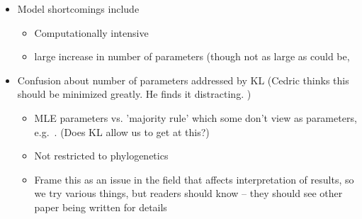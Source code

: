 \documentclass[12pt,letterpaper]{article}
\begin{document}
\begin{itemize}
\begin{itemize}
  \end{itemize}
\item Model shortcomings include 
  \begin{itemize}
  \item Computationally intensive
  \item large increase in number of parameters (though not as large as could be, \citep[c.f.][HIV entropy models]{RodrigueAndLartillot2014}
  \end{itemize}
\item Confusion about number of parameters addressed by KL (Cedric thinks this should be minimized greatly.  
  He finds it distracting.
)

  \begin{itemize}
  \item MLE parameters vs. 'majority rule' which some don't view as parameters, e.g.~\citet{YangAndNielsen2008}. (Does KL allow us to get at this?)
  \item Not restricted to phylogenetics
  \item Frame this as an issue in the field that affects interpretation of results, so we try various things, but readers should know -- they should see other paper being written for details
  \end{itemize}
\end{itemize}
\end{document}
